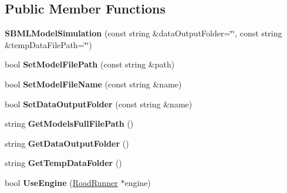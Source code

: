 \subsection*{Public Member Functions}
\begin{DoxyCompactItemize}
\item 
\hypertarget{classrr_1_1_s_b_m_l_model_simulation_ae836bdd0b9ba32e716bb936f23c394d0}{{\bfseries S\-B\-M\-L\-Model\-Simulation} (const string \&data\-Output\-Folder=\char`\"{}\char`\"{}, const string \&temp\-Data\-File\-Path=\char`\"{}\char`\"{})}\label{classrr_1_1_s_b_m_l_model_simulation_ae836bdd0b9ba32e716bb936f23c394d0}

\item 
\hypertarget{classrr_1_1_s_b_m_l_model_simulation_a3e1f9dbf8939eafeed739a84d9e02ddb}{bool {\bfseries Set\-Model\-File\-Path} (const string \&path)}\label{classrr_1_1_s_b_m_l_model_simulation_a3e1f9dbf8939eafeed739a84d9e02ddb}

\item 
\hypertarget{classrr_1_1_s_b_m_l_model_simulation_a29a0e1955d7f5b1ae1fea6fbd19ad85d}{bool {\bfseries Set\-Model\-File\-Name} (const string \&name)}\label{classrr_1_1_s_b_m_l_model_simulation_a29a0e1955d7f5b1ae1fea6fbd19ad85d}

\item 
\hypertarget{classrr_1_1_s_b_m_l_model_simulation_a92fb11cb280df97eff51973a17be8d88}{bool {\bfseries Set\-Data\-Output\-Folder} (const string \&name)}\label{classrr_1_1_s_b_m_l_model_simulation_a92fb11cb280df97eff51973a17be8d88}

\item 
\hypertarget{classrr_1_1_s_b_m_l_model_simulation_a3a884571a8337da75f89aac9fb9c5cc0}{string {\bfseries Get\-Models\-Full\-File\-Path} ()}\label{classrr_1_1_s_b_m_l_model_simulation_a3a884571a8337da75f89aac9fb9c5cc0}

\item 
\hypertarget{classrr_1_1_s_b_m_l_model_simulation_a8160a3bf345b2333c70f5b2b2120dea9}{string {\bfseries Get\-Data\-Output\-Folder} ()}\label{classrr_1_1_s_b_m_l_model_simulation_a8160a3bf345b2333c70f5b2b2120dea9}

\item 
\hypertarget{classrr_1_1_s_b_m_l_model_simulation_a80114ca7df9fdb41534238eced1404e5}{string {\bfseries Get\-Temp\-Data\-Folder} ()}\label{classrr_1_1_s_b_m_l_model_simulation_a80114ca7df9fdb41534238eced1404e5}

\item 
\hypertarget{classrr_1_1_s_b_m_l_model_simulation_ad14d2dc5321366ac8f0453e557514189}{bool {\bfseries Use\-Engine} (\hyperlink{classrr_1_1_road_runner}{Road\-Runner} $\ast$engine)}\label{classrr_1_1_s_b_m_l_model_simulation_ad14d2dc5321366ac8f0453e557514189}


\end{DoxyCompactItemize}
